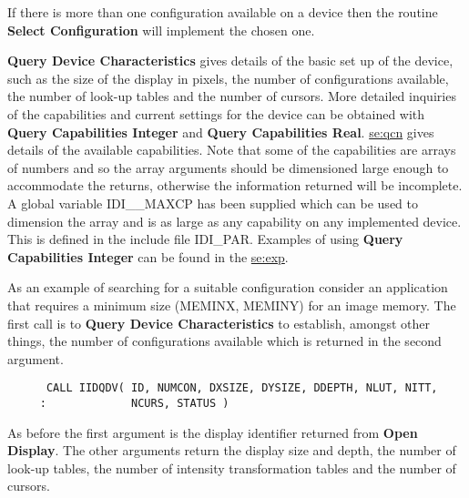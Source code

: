 If there is more than one configuration available on a device then the
routine {\bf Select Configuration} will implement the chosen one.

{\bf Query Device Characteristics} gives details of the basic set up
of the device, such as the size of the display in pixels, the number
of configurations available, the number of look-up tables and the number
of cursors. More detailed inquiries of the capabilities and current
settings for the device can be obtained with {\bf Query Capabilities
Integer} and {\bf Query Capabilities Real}.
\hyperref{This appendix}{Appendix~}{}{se:qcn} gives details of the
available capabilities. Note that
some of the capabilities are arrays of numbers and so the array arguments
should be dimensioned large enough to accommodate the returns, otherwise the
information returned will be incomplete. A global variable IDI\_\_MAXCP
has been supplied which can be used to dimension the array and is
as large as any capability on any implemented device. This is defined
in the include file IDI\_PAR. Examples of using
{\bf Query Capabilities Integer} can be found in the
\hyperref{test program}{in appendix~}{}{se:exp}.

As an example of searching for a suitable configuration consider an
application that requires a minimum size (MEMINX, MEMINY) for an
image memory. The first call is to {\bf Query Device Characteristics}
to establish, amongst other things, the number of configurations
available which is returned in the second argument.
\begin{small}
\begin{verbatim}
      CALL IIDQDV( ID, NUMCON, DXSIZE, DYSIZE, DDEPTH, NLUT, NITT,
     :             NCURS, STATUS )
\end{verbatim}
\end{small}
As before the first argument is the display identifier returned from
{\bf Open Display}. The other arguments return the display size and
depth, the number of look-up tables, the number of intensity
transformation tables and the number of cursors.

